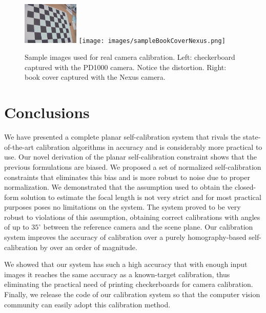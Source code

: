 \documentclass[10pt,twocolumn,letterpaper]{article}
\begin{document}
\begin{figure}
\centering
\includegraphics[height=2cm]{images/sampleOldCam.jpg}
\texttt{[image: images/sampleBookCoverNexus.png]}
\caption{Sample images used for real camera calibration. Left: checkerboard captured with the PD1000 camera. Notice the distortion. Right: book cover captured with the Nexus camera.}
\end{figure}  

\section{Conclusions}

We have presented a complete planar self-calibration system that rivals the state-of-the-art calibration algorithms in accuracy and is considerably more practical to use. Our novel derivation of the planar self-calibration constraint shows that the previous formulations are biased. We proposed a set of normalized self-calibration constraints that eliminates this bias and is more robust to noise due to proper normalization. We demonstrated that the assumption used to obtain the closed-form solution to estimate the focal length is not very strict and for most practical purposes poses no limitations on the system. The system proved to be very robust to violations of this assumption, obtaining correct calibrations with angles of up to $35^\circ$ between the reference camera and the scene plane. Our calibration system improves the accuracy of calibration over a purely homography-based self-calibration by over an order of magnitude. 

We showed that our system has such a high accuracy that with enough input images it reaches the same accuracy as a known-target calibration, thus eliminating the practical need of printing checkerboards for camera calibration. Finally, we release the code of our calibration system so that the computer vision community can easily adopt this calibration method.

\clearpage

{\small


}
\end{document}
